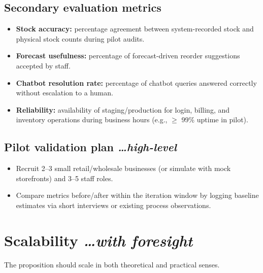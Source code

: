 \documentclass[11pt,a4paper]{article}
\newcommand{\BvrHint}[1]{%
  {\normalfont\normalsize\itshape\hfill #1}}
\begin{document}
\subsection{Secondary evaluation metrics}
\begin{itemize}[leftmargin=0.7cm]
    \item \textbf{Stock accuracy:} percentage agreement between system-recorded stock and physical stock counts during pilot audits.
    \item \textbf{Forecast usefulness:} percentage of forecast-driven reorder suggestions accepted by staff.
    \item \textbf{Chatbot resolution rate:} percentage of chatbot queries answered correctly without escalation to a human.
    \item \textbf{Reliability:} availability of staging/production for login, billing, and inventory operations during business hours (e.g., $\ge$ 99\% uptime in pilot).
\end{itemize}

\subsection{Pilot validation plan %
\BvrHint{\ldots high-level}}
\begin{itemize}[leftmargin=0.7cm]
    \item Recruit 2--3 small retail/wholesale businesses (or simulate with mock storefronts) and 3--5 staff roles.
    \item Compare metrics before/after within the iteration window by logging baseline estimates via short interviews or existing process observations.
\end{itemize}

\section{Scalability %
\BvrHint{\ldots with foresight}}
The proposition should scale in both theoretical and practical senses.
\end{document}
